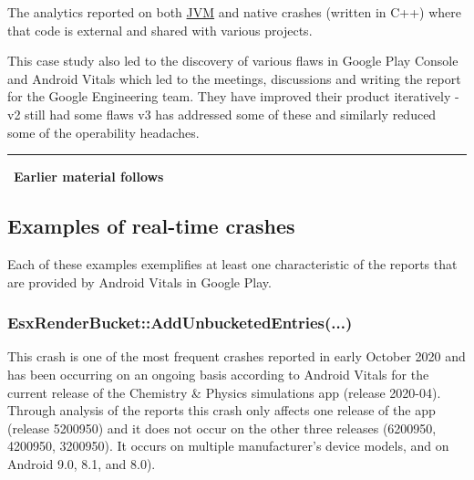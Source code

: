 The analytics reported on both \href{glossary_jvm}{JVM} and native crashes (written in C++) where that code is external and shared with various projects. 

This case study also led to the discovery of various flaws in Google Play Console and Android Vitals which led to the meetings, discussions and writing the report for the Google Engineering team. They have improved their product iteratively - v2 still had some flaws v3 has addressed some of these and similarly reduced some of the operability headaches.




\par\noindent\rule{\textwidth}{0.4pt}
~\textbf{Earlier material follows}









\subsection{Examples of real-time crashes}
Each of these examples exemplifies at least one characteristic of the reports that are provided by Android Vitals in Google Play.

\subsubsection{EsxRenderBucket::AddUnbucketedEntries(...)}
This crash is one of the most frequent crashes reported in early October 2020 and has been occurring on an ongoing basis according to Android Vitals for the current release of the Chemistry \& Physics simulations app (release 2020-04). Through analysis of the reports this crash only affects one release of the app (release 5200950) and it does not occur on the other three releases (6200950, 4200950, 3200950). It occurs on multiple manufacturer's device models, and on Android 9.0, 8.1, and 8.0). 

